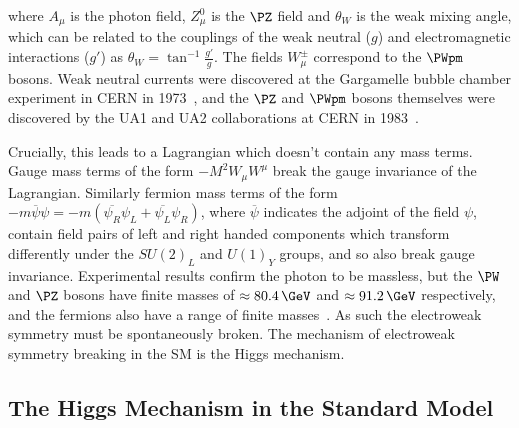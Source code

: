 where $A_{\mu}$ is the photon field, $Z_{\mu}^{0}$ is the $\PZ$ field
and $\theta_{W}$ is the weak mixing angle,
which can be related to the couplings of the weak neutral ($g$) and electromagnetic
interactions ($g'$) as $\theta_{W}=\tan^{-1}{\frac{g'}{g}}$. The fields
$W_{\mu}^{\pm}$ correspond to the $\PWpm$ bosons. Weak neutral
currents were discovered at the Gargamelle bubble chamber experiment in CERN in
1973~\cite{Hasert:1973ff}, and the $\PZ$ and $\PWpm$ bosons themselves were
discovered by the UA1 and UA2 collaborations at CERN in
1983~\cite{Arnison:1983rp,Banner:1983jy,Arnison:1983mk,Bagnaia:1983zx}.

Crucially, this leads to a Lagrangian which doesn't contain any mass terms.
Gauge mass terms of the form $-M^{2}W_{\mu}W^{\mu}$ break the gauge invariance
of the Lagrangian. Similarly fermion mass terms of the form
$-m\overline{\psi}\psi = -m(\overline{\psi_{R}}\psi_{L} +
\overline{\psi_{L}}\psi_{R})$, where $\overline\psi$ indicates the adjoint of
the field $\psi$, contain field pairs of left and right handed components which transform differently
under the $SU(2)_{L}$ and $U(1)_{Y}$ groups, and so also break gauge invariance.
Experimental results confirm the photon to be massless, but the $\PW$ and $\PZ$
bosons have finite masses of $\approx80.4\,\GeV$ and $\approx91.2\,\GeV$
respectively, and the fermions also have a range of finite masses~\cite{PDG}. As
such the electroweak symmetry must be spontaneously broken. The mechanism of
electroweak symmetry breaking in the \ac{SM} is the Higgs mechanism.

\subsection{The Higgs Mechanism in the Standard Model}
\label{sec:SMHiggs}

